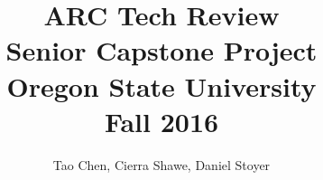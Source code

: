 \documentclass[draftclsnofoot,onecolumn,10pt]{IEEEtran}
\begin{document}
\begin{titlepage}
\title{
ARC Tech Review\\
\LARGE
Senior Capstone Project\\
Oregon State University\\
Fall 2016
}

\author{Tao Chen, Cierra Shawe, Daniel Stoyer}
\maketitle

\begin{abstract}


\newline
\newline\newline

\end{abstract}

\thispagestyle{empty} %

\end{titlepage}
\newpage

\tableofcontents

\newpage

\section{}
\end{document}
